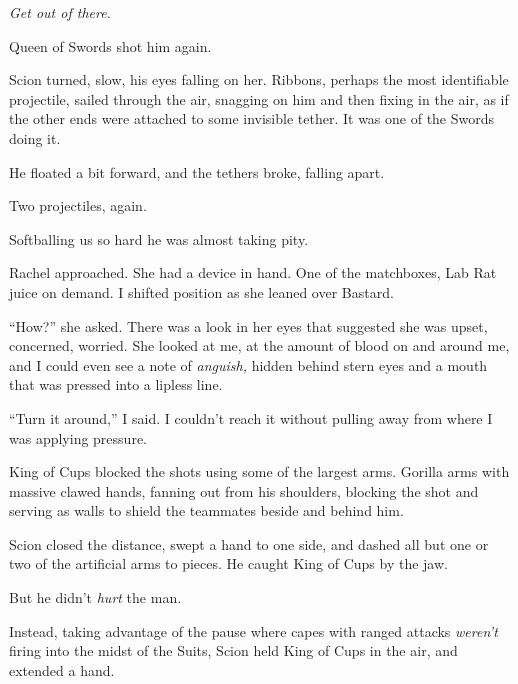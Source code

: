 \emph{Get out of there.}



Queen of Swords shot him again.



Scion turned, slow, his eyes falling on her.  Ribbons, perhaps the most identifiable projectile, sailed through the air, snagging on him and then fixing in the air, as if the other ends were attached to some invisible tether.  It was one of the Swords doing it.



He floated a bit forward, and the tethers broke, falling apart.



Two projectiles, again.



Softballing us so hard he was almost taking pity.



Rachel approached.  She had a device in hand.  One of the matchboxes, Lab Rat juice on demand.  I shifted position as she leaned over Bastard.



``How?'' she asked.  There was a look in her eyes that suggested she was upset, concerned, worried.  She looked at me, at the amount of blood on and around me, and I could even see a note of \emph{anguish, }hidden behind stern eyes and a mouth that was pressed into a lipless line.



``Turn it around,'' I said.  I couldn't reach it without pulling away from where I was applying pressure.



King of Cups blocked the shots using some of the largest arms.  Gorilla arms with massive clawed hands, fanning out from his shoulders, blocking the shot and serving as walls to shield the teammates beside and behind him.



Scion closed the distance, swept a hand to one side, and dashed all but one or two of the artificial arms to pieces.  He caught King of Cups by the jaw.



But he didn't \emph{hurt} the man.



Instead, taking advantage of the pause where capes with ranged attacks \emph{weren't} firing into the midst of the Suits, Scion held King of Cups in the air, and extended a hand.



